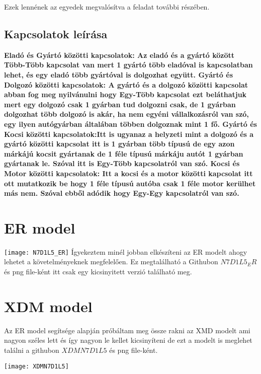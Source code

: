 \documentclass[14pt]{extarticle}
\begin{document}
\begin{normalsize}
\begin{normalsize}
			Ezek lennének az egyedek megvalósítva a feladat további részében.
			
		\end{normalsize}
		\subsection{Kapcsolatok leírása}
		\begin{normalsize}
			\bfseries Eladó és Gyártó közötti kapcsolatok: \mdseries Az eladó és a gyártó között \bfseries Több-Több \mdseries kapcsolat van mert 1 gyártó több eladóval is kapcsolatban lehet, és egy eladó több gyártóval is dolgozhat együtt.\newline
			\bfseries Gyártó és Dolgozó közötti kapcsolatok: \mdseries A gyártó és a dolgozó közötti kapcsolat abban fog meg nyilvánulni hogy \bfseries Egy-Több \mdseries kapcsolat ezt beláthatjuk mert egy dolgozó csak 1 gyárban tud dolgozni csak, de 1 gyárban dolgozhat több dolgozó is akár, ha nem egyéni vállalkozásról van szó, egy ilyen autógyárban általában többen dolgoznak mint 1 fő.\newline
			\bfseries Gyártó és Kocsi közötti kapcsolatok:\mdseries Itt is ugyanaz a helyzeti mint a dolgozó és a gyártó közötti kapcsolat itt is 1 gyárban több típusú de egy azon márkájú kocsit gyártanak de 1 féle típusú márkáju autót 1 gyárban gyártanak le. Szóval itt is \bfseries Egy-Több \mdseries kapcsolatról van szó.\newline
			\bfseries Kocsi és Motor közötti kapcsolatok: \mdseries Itt a kocsi és a motor közötti kapcsolat itt ott mutatkozik be hogy 1 féle típusú autóba csak 1 féle motor kerülhet más nem. Szóval ebből adódik hogy \bfseries Egy-Egy  \mdseries kapcsolatról van szó. 
		\end{normalsize}
		\section{ER model}
		\texttt{[image: N7D1L5\_ER]}
		Ígyekeztem minél jobban elkészíteni az ER modelt ahogy lehetet a követelményeknek megfelelően. Ez megtalálható a Githubon $N7D1L5_ER$ és png file-ként itt csak egy kicsinyitett verzió található meg.
		\section{XDM model}
		Az ER model segítsége alapján próbáltam meg össze rakni az XMD modelt ami nagyon széles lett és így nagyon le kellet kicsinyíteni de ezt a modelt is meglehet találni a githubon $XDMN7D1L5$ és png file-ként.
		\begin{center}
			\texttt{[image: XDMN7D1L5]}
		\end{center}

\end{normalsize}
\end{document}
